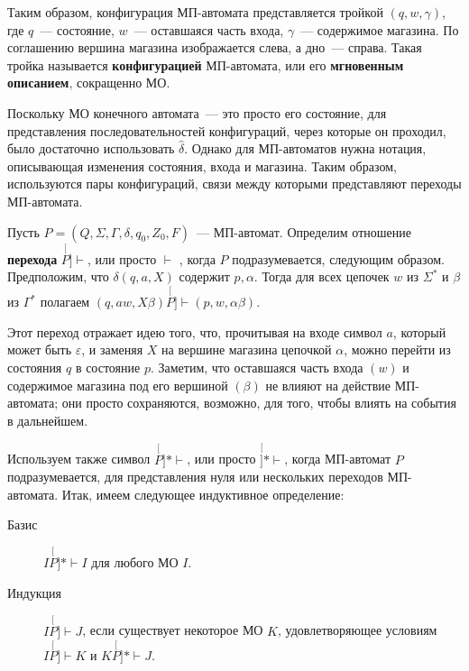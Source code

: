 \documentclass[a4paper,12pt]{article}
\begin{document}
	Таким образом, конфигурация МП-автомата представляется тройкой \((q, w, \gamma)\), где \(q\)~--- состояние, \(w\)~--- оставшаяся часть входа, \(\gamma\)~--- содержимое магазина. По соглашению вершина магазина изображается слева, а дно~--- справа. Такая тройка называется \textbf{конфигурацией} МП-автомата, или его \textbf{мгновенным описанием}, сокращенно МО.
	
	Поскольку МО конечного автомата~--- это просто его состояние, для представления последовательностей конфигураций, через которые он проходил, было достаточно использовать \(\hat{\delta}\). Однако для МП-автоматов нужна нотация, описывающая изменения состояния, входа и магазина. Таким образом, используются пары конфигураций, связи между которыми представляют переходы МП-автомата.

	Пусть \(P = (Q, \Sigma, \Gamma, \delta, q_0, Z_0, F)\)~--- МП-автомат. Определим отношение \textbf{перехода} \(\stackrel[P]{}{\vdash}\), или просто \(\vdash\) , когда \(P\) подразумевается, следующим образом. Предположим, что \(\delta(q, a, X)\) содержит \(p, \alpha\). Тогда для всех цепочек \(w\) из \(\Sigma^*\) и \(\beta\) из \(\Gamma^*\) полагаем \((q, aw, X\beta) \stackrel[P]{}{\vdash} (p, w, \alpha \beta)\).
	
	Этот переход отражает идею того, что, прочитывая на входе символ \(a\), который может быть \(\varepsilon\), и заменяя \(X\) на вершине магазина цепочкой \(\alpha\), можно перейти из состояния \(q\) в состояние \(p\). Заметим, что оставшаяся часть входа \((w)\) и содержимое магазина под его вершиной \((\beta)\) не влияют на действие МП-автомата; они просто сохраняются, возможно, для того, чтобы влиять на события в дальнейшем.
	
	Используем также символ \(\stackrel[P]{*}{\vdash}\), или просто \(\stackrel[]{*}{\vdash}\), когда МП-автомат \(P\) подразумевается, для представления нуля или нескольких переходов МП-автомата. Итак, имеем следующее индуктивное определение:
	\begin{description}
		\item[Базис] \(I \stackrel[P]{*}{\vdash} I\) для любого МО \(I\).
		\item[Индукция] \(I \stackrel[P]{}{\vdash} J\), если существует некоторое МО \(K\), удовлетворяющее условиям \(I \stackrel[P]{}{\vdash} K\) и \(K \stackrel[P]{*}{\vdash} J\).
	\end{description}
\end{document}
